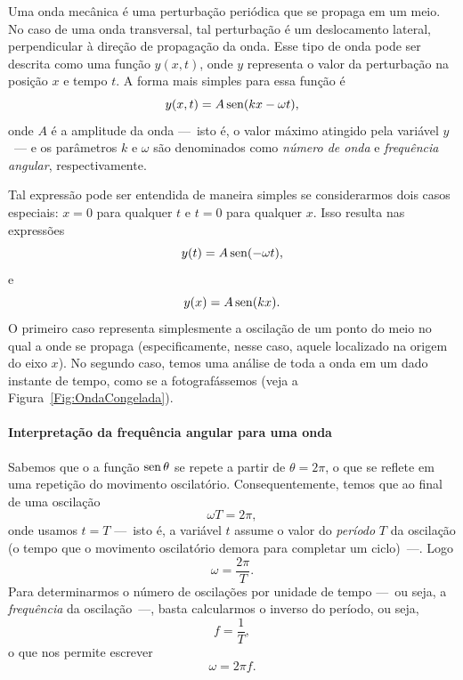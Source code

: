 Uma onda mecânica é uma perturbação periódica que se propaga em um meio. No caso de uma onda transversal, tal perturbação é um deslocamento lateral, perpendicular à direção de propagação da onda. Esse tipo de onda pode ser descrita como uma função $y(x,t)$, onde $y$ representa o valor da perturbação na posição $x$ e tempo $t$. A forma mais simples para essa função é
\begin{equation}\label{Eq:OndaUnidimensional}
	y(x,t) = A \operatorname{sen}(kx - \omega t),
\end{equation}
%
onde $A$ é a amplitude da onda ---~isto é, o valor máximo atingido pela variável $y$~--- e os parâmetros $k$ e $\omega$ são denominados como \emph{número de onda} e \emph{frequência angular}, respectivamente.

Tal expressão pode ser entendida de maneira simples se considerarmos dois casos especiais: $x = 0$ para qualquer $t$ e $t = 0$ para qualquer $x$. Isso resulta nas expressões
\begin{equation}
	y(t) = A \operatorname{sen} (-\omega t),
\end{equation}
%
e
\begin{equation}
	y(x) = A \operatorname{sen}(kx).
\end{equation}
%
O primeiro caso representa simplesmente a oscilação de um ponto do meio no qual a onde se propaga (especificamente, nesse caso, aquele localizado na origem do eixo $x$). No segundo caso, temos uma análise de toda a onda em um dado instante de tempo, como se a fotografássemos (veja a Figura~\ref{Fig:OndaCongelada}).

\paragraph{Interpretação da frequência angular para uma onda}

Sabemos que o a função $\operatorname{sen} \theta$ se repete a partir de $\theta = 2\pi$, o que se reflete em uma repetição do movimento oscilatório. Consequentemente, temos que ao final de uma oscilação
\begin{equation}
	\omega T = 2 \pi,
\end{equation}
%
onde usamos $t = T$ ---~isto é, a variável $t$ assume o valor do \emph{período} $T$ da oscilação (o tempo que o movimento oscilatório demora para completar um ciclo)~---. Logo
\begin{equation}
	\omega = \frac{2 \pi}{T}.
\end{equation}
%
Para determinarmos o número de oscilações por unidade de tempo ---~ou seja, a \emph{frequência} da oscilação~---, basta calcularmos o inverso do período, ou seja,
\begin{equation}
	f = \frac{1}{T},
\end{equation}
%
o que nos permite escrever
\begin{equation}
	\omega = 2 \pi f.
\end{equation}


